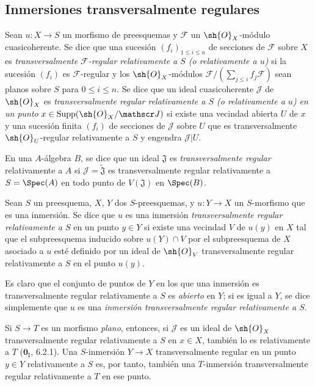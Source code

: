 \subsection{Inmersiones transversalmente regulares}
\label{subsection:IV.19.2}


\begin{definition}[19.2.1]
\label{IV.19.2.1}
Sean $u:X\to S$ un morfismo de preesquemas y $\mathscr F$ un $\sh{O}_X$-módulo cuasicoherente. Se dice que una sucesión $(f_i)_{1\leq i\leq n}$ de secciones de $\mathscr F$ sobre $X$ es \emph{transversalmente $\mathscr F$-regular relativamente a $S$ (\emph{o} relativamente a $u$)} si la sucesión $(f_i)$ es $\mathscr F$-regular y los $\sh{O}_X$-módulos
$\mathscr F/(\sum_{j\leq i}f_j\mathscr F)$
sean planos sobre $S$ para $0\leq i\leq n$. Se dice que un ideal cuasicoherente $\mathscr J$ de $\sh{O}_X$ es \emph{transversalmente regular relativamente a $S$ (\emph{o} relativamente a $u$) en un punto} $x\in\operatorname{Supp}(\sh{O}_X/\mathscr J)$ si existe una vecindad abierta $U$ de $x$ y una sucesión finita $(f_i)$ de secciones de $\mathscr J$ sobre $U$ que es transversalmente $\sh{O}_U$-regular relativamente a $S$ y engendra $\mathscr J|U$.

En una $A$-álgebra $B$, se dice que un ideal $\mathfrak J$ es \emph{transversalmente regular} relativamente a $A$ si $\mathscr J=\widetilde{\mathfrak J}$ es transversalmente regular relativamente a $S=\Spec(A)$ en todo punto de $V(\mathfrak J)$ en $\Spec(B)$.
\end{definition}

\begin{definition}[19.2.2]
\label{IV.19.2.2}
Sean $S$ un preesquema, $X$, $Y$ dos $S$-preesquemas, y $u:Y\to X$ un $S$-morfismo que es una inmersión. Se dice que $u$ es una inmersión \emph{transversalmente regular relativamente a $S$} en un punto $y\in Y$ si existe una vecindad $V$ de $u(y)$ en $X$ tal que el subpreesquema inducido sobre $u(Y)\cap V$ por el subpreesquema de $X$ asociado a $u$ esté definido por un ideal de $\sh{O}_V$ transversalmente regular relativamente a $S$ en el punto $u(y)$.

Es claro que el conjunto de puntos de $Y$ en los que una inmersión es transversalmente regular relativamente a $S$ es \emph{abierto} en $Y$; si es igual a $Y$, se dice simplemente que $u$ es una \emph{inmersión transversalmente regular relativamente a $S$}.

Si $S\to T$ es un morfismo \emph{plano}, entonces, si $\mathscr J$ es un ideal de $\sh{O}_X$ transversalmente regular relativamente a $S$ en $x\in X$, también lo es relativamente a $T$ ($\mathbf{0}_{\mathrm I}$, 6.2.1). Una $S$-inmersión $Y\to X$ transversalmente regular en un punto $y\in Y$ relativamente a $S$ es, por tanto, también una $T$-inmersión transversalmente regular relativamente a $T$ en ese punto.
\end{definition}

